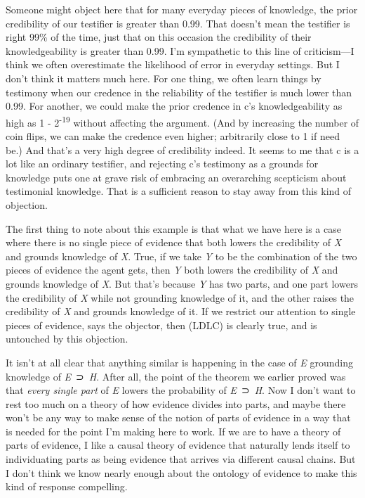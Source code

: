 \documentclass[
  10pt,
  letterpaper,
  DIV=11,
  numbers=noendperiod,
  twoside]{scrartcl}
\begin{document}
Someone might object here that for many everyday pieces of knowledge,
the prior credibility of our testifier is greater than 0.99. That
doesn't mean the testifier is right 99\% of the time, just that on this
occasion the credibility of their knowledgeability is greater than 0.99.
I'm sympathetic to this line of criticism---I think we often
overestimate the likelihood of error in everyday settings. But I don't
think it matters much here. For one thing, we often learn things by
testimony when our credence in the reliability of the testifier is much
lower than 0.99. For another, we could make the prior credence in c's
knowledgeability as high as 1 - 2\textsuperscript{-19} without affecting
the argument. (And by increasing the number of coin flips, we can make
the credence even higher; arbitrarily close to 1 if need be.) And that's
a very high degree of credibility indeed. It seems to me that c is a lot
like an ordinary testifier, and rejecting c's testimony as a grounds for
knowledge puts one at grave risk of embracing an overarching scepticism
about testimonial knowledge. That is a sufficient reason to stay away
from this kind of objection.

The first thing to note about this example is that what we have here is
a case where there is no single piece of evidence that both lowers the
credibility of \emph{X} and grounds knowledge of \emph{X}. True, if we
take \emph{Y} to be the combination of the two pieces of evidence the
agent gets, then \emph{Y} both lowers the credibility of \emph{X} and
grounds knowledge of \emph{X}. But that's because \emph{Y} has two
parts, and one part lowers the credibility of \emph{X} while not
grounding knowledge of it, and the other raises the credibility of
\emph{X} and grounds knowledge of it. If we restrict our attention to
single pieces of evidence, says the objector, then (LDLC) is clearly
true, and is untouched by this objection.

It isn't at all clear that anything similar is happening in the case of
\emph{E} grounding knowledge of \emph{E}~⊃~\emph{H}. After all, the
point of the theorem we earlier proved was that \emph{every single part}
of \emph{E} lowers the probability of \emph{E}~⊃~\emph{H}. Now I don't
want to rest too much on a theory of how evidence divides into parts,
and maybe there won't be any way to make sense of the notion of parts of
evidence in a way that is needed for the point I'm making here to work.
If we are to have a theory of parts of evidence, I like a causal theory
of evidence that naturally lends itself to individuating parts as being
evidence that arrives via different causal chains. But I don't think we
know nearly enough about the ontology of evidence to make this kind of
response compelling.
\end{document}
